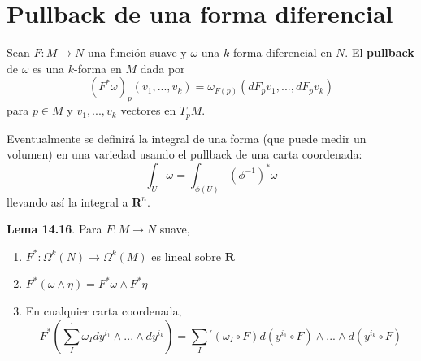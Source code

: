 \documentclass[11pt]{article}
\theoremstyle{definition}
\begin{document}
\section*{Pullback de una forma diferencial}

Sean $F:M\longrightarrow N$ una función suave y  $\omega$ una $k$-forma diferencial en $N$. El \textbf{pullback} de $\omega$ es una $k$-forma en $M$ dada por  
\begin{equation*}
(F^*\omega)_p(v_1,...,v_k)=\omega_{F(p)}(dF_pv_1,...,dF_{p}v_k)
\end{equation*}
para $p\in M$ y $v_1,...,v_k$ vectores en $T_pM$.

Eventualmente se definirá la integral de una forma (que puede medir un volumen) en una variedad usando el pullback de una carta coordenada:
\begin{equation*}
    \int_U\omega=\int_{\phi(U)}(\phi^{-1})^*\omega
\end{equation*}
llevando así la integral a $\mathbf{R}^n$. \par
    \par\textbf{Lema 14.16}. Para $F:M\longrightarrow N$ suave,
    \begin{enumerate}[label=(\alph*)]
        \item $F^*:\Omega^k(N)\longrightarrow\Omega^k(M)$ es lineal sobre $\mathbf{R}$
        \item $F^*(\omega\wedge\eta)=F^*\omega\wedge F^*\eta$
        \item En cualquier carta coordenada,
        \begin{equation*}
            F^*\left(\sum_{I}^{\big'}\omega_Idy^{i_1}\wedge ...\wedge dy^{i_k}\right)=\sum_I^{}^{\big'} (\omega_I\circ F) d(y^{i_1}\circ F)\wedge ...\wedge  d(y^{i_k}\circ F)
        \end{equation*}
    \end{enumerate}
\end{document}
